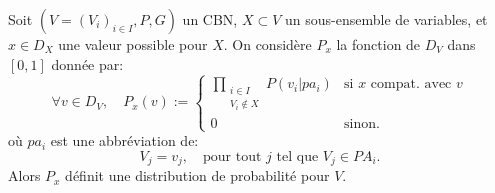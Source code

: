 \begin{proposition}
  \label{prop:Px}
Soit $(V=(V_i)_{i\in I},P,G)$ un CBN, $X\subset V$ un sous-ensemble de variables, et $x\in D_X$ une valeur possible pour $X$.
On considère $P_x$ la fonction de $D_V$ dans $[0,1]$ donnée par:
\begin{equation}
\label{eq:2}
\forall v\in D_{V},\quad P_x(v):=
\begin{cases}
\displaystyle \prod_{\substack{i\in I\\V_i\not \in X}}^{}P(v_i|pa_i)&\text{si $x$ compat. avec $v$}\\
0&\text{sinon}.
\end{cases}
\end{equation}
où $pa_i$ est une abbréviation de: \[ V_j=v_j,\quad \text{pour tout $j$ tel que $V_j\in PA_i$}. \]
Alors $P_x$ définit une distribution de probabilité pour $V$.
\end{proposition}
